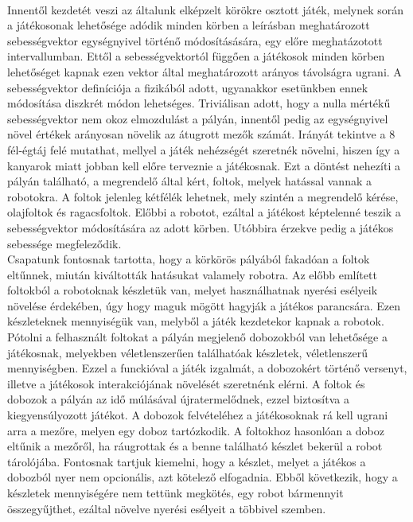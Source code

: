 {\\
Innentől kezdetét veszi az általunk elképzelt körökre osztott játék, melynek során a játékosonak lehetősége adódik minden körben a leírásban meghatározott sebességvektor egységnyivel történő módosításására, egy előre meghatázotott intervallumban. Ettől a sebességvektortól függően a játékosok minden körben lehetőséget kapnak ezen vektor által meghatározott arányos távolságra ugrani. A sebességvektor definíciója a fizikából adott, ugyanakkor esetünkben ennek módosítása diszkrét módon lehetséges. Triviálisan adott, hogy a nulla mértékű sebességvektor nem okoz elmozdulást a pályán, innentől pedig az egységnyivel növel értékek arányosan növelik az átugrott mezők számát. Irányát tekintve a 8 fél-égtáj felé mutathat, mellyel a játék nehézségét szeretnék növelni, hiszen így a kanyarok miatt jobban kell előre terveznie a játékosnak. Ezt a döntést nehezíti a pályán található, a megrendelő által kért, foltok, melyek hatással vannak a robotokra. A foltok jelenleg kétfélék lehetnek, mely szintén a megrendelő kérése, olajfoltok és ragacsfoltok. Előbbi a robotot, ezáltal a játékost képtelenné teszik a sebességvektor módosítására az adott körben. Utóbbira érzekve pedig a játékos sebessége megfeleződik. 
\\
Csapatunk fontosnak tartotta, hogy a körkörös pályából fakadóan a foltok eltűnnek, miután kiváltották hatásukat valamely robotra. Az előbb említett foltokból a robotoknak készletük van, melyet használhatnak nyerési esélyeik növelése érdekében, úgy hogy maguk mögött hagyják a játékos parancsára. Ezen készleteknek mennyiségük van, melyből a játék kezdetekor kapnak a robotok. Pótolni a felhasznált foltokat a pályán megjelenő dobozokból van lehetősége a játékosnak, melyekben véletlenszerűen találhatóak készletek, véletlenszerű mennyiségben. Ezzel a funckióval a játék izgalmát, a dobozokért történő versenyt, illetve a játékosok interakciójának növelését szeretnénk elérni. A foltok és dobozok a pályán az idő múlásával újratermelődnek, ezzel biztosítva a kiegyensúlyozott játékot. A dobozok felvételéhez a játékosoknak rá kell ugrani arra a mezőre, melyen egy doboz tartózkodik. A foltokhoz hasonlóan a doboz eltűnik a mezőről, ha ráugrottak és a benne található készlet bekerül a robot tárolójába. Fontosnak tartjuk kiemelni, hogy a készlet, melyet a játékos a dobozból nyer nem opcionális, azt kötelező elfogadnia. Ebből következik, hogy a készletek mennyiségére nem tettünk megkötés, egy robot bármennyit összegyűjthet, ezáltal növelve nyerési esélyeit a többivel szemben.
\\
}
